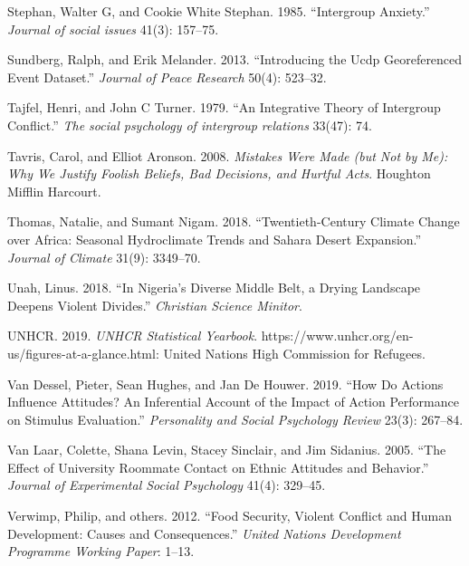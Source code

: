 \documentclass[11pt]{article}
\begin{document}
\begin{cslreferences}
\leavevmode\hypertarget{ref-stephan1985intergroup}{}%
Stephan, Walter G, and Cookie White Stephan. 1985. ``Intergroup
Anxiety.'' \emph{Journal of social issues} 41(3): 157--75.

\leavevmode\hypertarget{ref-ucdp}{}%
Sundberg, Ralph, and Erik Melander. 2013. ``Introducing the Ucdp
Georeferenced Event Dataset.'' \emph{Journal of Peace Research} 50(4):
523--32.

\leavevmode\hypertarget{ref-tajfel1979integrative}{}%
Tajfel, Henri, and John C Turner. 1979. ``An Integrative Theory of
Intergroup Conflict.'' \emph{The social psychology of intergroup
relations} 33(47): 74.

\leavevmode\hypertarget{ref-tavris2008mistakes}{}%
Tavris, Carol, and Elliot Aronson. 2008. \emph{Mistakes Were Made (but
Not by Me): Why We Justify Foolish Beliefs, Bad Decisions, and Hurtful
Acts}. Houghton Mifflin Harcourt.

\leavevmode\hypertarget{ref-thomas2018sahara}{}%
Thomas, Natalie, and Sumant Nigam. 2018. ``Twentieth-Century Climate
Change over Africa: Seasonal Hydroclimate Trends and Sahara Desert
Expansion.'' \emph{Journal of Climate} 31(9): 3349--70.

\leavevmode\hypertarget{ref-unah2018nigeria}{}%
Unah, Linus. 2018. ``In Nigeria's Diverse Middle Belt, a Drying
Landscape Deepens Violent Divides.'' \emph{Christian Science Minitor}.

\leavevmode\hypertarget{ref-unhcr2019}{}%
UNHCR. 2019. \emph{UNHCR Statistical Yearbook}.
https://www.unhcr.org/en-us/figures-at-a-glance.html: United Nations
High Commission for Refugees.

\leavevmode\hypertarget{ref-van2019actions}{}%
Van Dessel, Pieter, Sean Hughes, and Jan De Houwer. 2019. ``How Do
Actions Influence Attitudes? An Inferential Account of the Impact of
Action Performance on Stimulus Evaluation.'' \emph{Personality and
Social Psychology Review} 23(3): 267--84.

\leavevmode\hypertarget{ref-van2005effect}{}%
Van Laar, Colette, Shana Levin, Stacey Sinclair, and Jim Sidanius. 2005.
``The Effect of University Roommate Contact on Ethnic Attitudes and
Behavior.'' \emph{Journal of Experimental Social Psychology} 41(4):
329--45.

\leavevmode\hypertarget{ref-verwimp2012food}{}%
Verwimp, Philip, and others. 2012. ``Food Security, Violent Conflict and
Human Development: Causes and Consequences.'' \emph{United Nations
Development Programme Working Paper}: 1--13.


\end{cslreferences}
\end{document}
